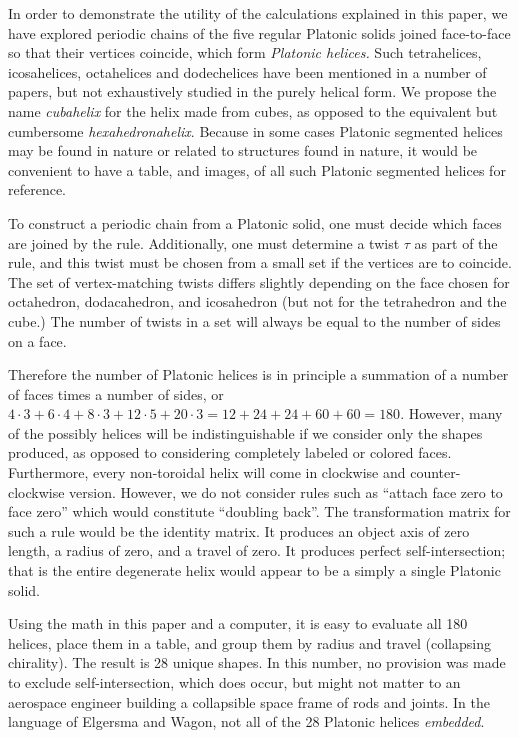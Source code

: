 \documentclass[11pt]{article}
\begin{document}
{\label{sec:platonic}

In order to demonstrate the utility of the calculations explained in this paper, we have explored
periodic chains of the five regular Platonic solids joined face-to-face so that their vertices coincide,
which form {\em Platonic helices.}
Such tetrahelices, icosahelices, octahelices and dodechelices
have been mentioned in a number of papers\cite{elgersma2016quadrahelix,babiker2012combinatorial,lord2001sphere}, but not exhaustively studied in
the purely helical form.
We propose the name {\em cubahelix} for the helix made from cubes, as opposed to the equivalent
but cumbersome {\em hexahedronahelix}.
Because in some cases Platonic segmented helices may be found in nature or
related to structures found in nature\cite{lord2004gamma,pearce1990structure},
it would be convenient to have a table, and images, of all such Platonic segmented helices for reference.

To construct a periodic chain from a Platonic solid, one must decide which faces are joined by the rule.
Additionally, one must determine a twist
$\tau$ as part of the rule, and this twist must be chosen from a small set if the vertices are to coincide.
The set of vertex-matching twists differs slightly depending on the face chosen for octahedron, dodacahedron, and icosahedron
(but not for the tetrahedron and the cube.) The number of twists in a set will always be equal to the number of sides on a face.

Therefore the number of Platonic helices is in principle a summation of a number of faces times a number of sides, or
$4 \cdot 3 + 6 \cdot 4 + 8 \cdot 3 + 12 \cdot 5 + 20 \cdot 3 = 12 + 24 + 24 + 60 + 60 = 180$.
However, many of the possibly helices will be indistinguishable if we consider only the shapes produced, as
opposed to considering completely labeled or colored faces. Furthermore,
every non-toroidal helix will come in clockwise and counter-clockwise version.
However, we do not consider rules such as ``attach face zero to face zero''
which would constitute
``doubling back''\cite{elgersma2016quadrahelix}.
The transformation matrix for such a rule would be the identity matrix.
It produces an object axis of zero length, a radius of zero, and
a travel of zero. It produces perfect self-intersection; that is the entire
degenerate helix would appear to be a simply a single Platonic solid.

Using the math in this paper and a computer, it is easy to evaluate all 180 helices,
place them in a table, and group them
by radius and travel (collapsing chirality).
The result is 28 unique shapes. In this number, no provision was made to exclude
self-intersection,
which does occur, but might not matter to
an aerospace engineer building a collapsible space frame of rods and joints.
In the language of Elgersma and Wagon\cite{elgersma2016quadrahelix}, not
all of the 28 Platonic helices {\em embedded}.

}
\end{document}
